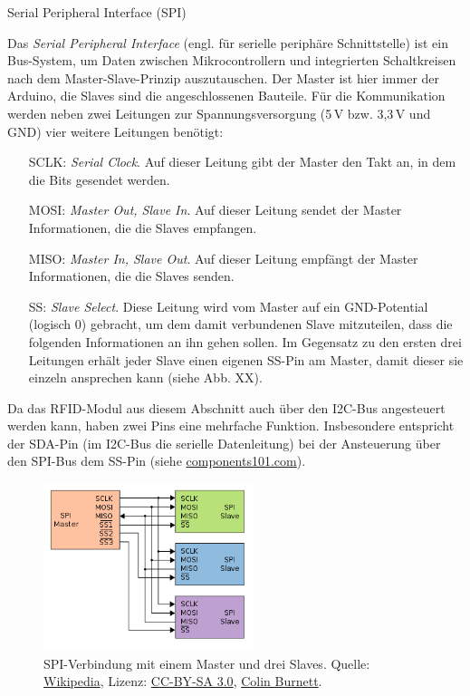 \begin{zsfg}{Serial Peripheral Interface (SPI)}
	
	Das \emph{Serial Peripheral Interface} (engl. für serielle periphäre Schnittstelle) ist ein Bus-System, um Daten zwischen Mikrocontrollern und integrierten Schaltkreisen nach dem Master-Slave-Prinzip auszutauschen. Der Master ist hier immer der Arduino, die Slaves sind die angeschlossenen Bauteile. Für die Kommunikation werden neben zwei Leitungen zur Spannungsversorgung (5\,V bzw. 3,3\,V und GND) vier weitere Leitungen benötigt:
	
	\begin{itemize}[itemsep=0ex, parsep=0ex]
		\item[SCLK:] \emph{Serial Clock}. Auf dieser Leitung gibt der Master den Takt an, in dem die Bits gesendet werden.
		\item[MOSI:] \emph{Master Out, Slave In}. Auf dieser Leitung sendet der Master Informationen, die die Slaves empfangen.
		\item[MISO:] \emph{Master In, Slave Out}. Auf dieser Leitung empfängt der Master Informationen, die die Slaves senden.
		\item[SS:] \emph{Slave Select}. Diese Leitung wird vom Master auf ein GND-Potential (logisch 0) gebracht, um dem damit verbundenen Slave mitzuteilen, dass die folgenden Informationen an ihn gehen sollen. Im Gegensatz zu den ersten drei Leitungen erhält jeder Slave einen eigenen SS-Pin am Master, damit dieser sie einzeln ansprechen kann (siehe Abb. XX). 
	\end{itemize}

	Da das RFID-Modul aus diesem Abschnitt auch über den I2C-Bus angesteuert werden kann, haben zwei Pins eine mehrfache Funktion. Insbesondere entspricht der SDA-Pin (im I2C-Bus die serielle Datenleitung) bei der Ansteuerung über den SPI-Bus dem SS-Pin (siehe \href{https://components101.com/wireless/rc522-rfid-module}{components101.com}).
	
	\begin{figure}[H]
		\centering
		\includegraphics[width=0.55\textwidth]{./pics/SPI-three-slaves.png}
		\caption{SPI-Verbindung mit einem Master und drei Slaves. Quelle: \href{https://de.wikipedia.org/wiki/Datei:SPI_three_slaves.svg}{Wikipedia}, Lizenz: \href{https://creativecommons.org/licenses/by-sa/3.0/deed.de}{CC-BY-SA 3.0}, \href{https://en.wikipedia.org/wiki/User:Cburnett}{Colin Burnett}.}
	\end{figure}
\end{zsfg}

